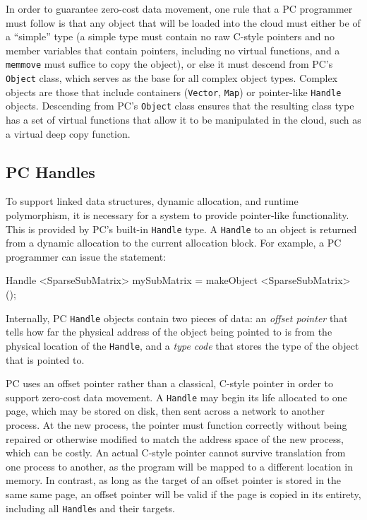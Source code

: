 In order to guarantee zero-cost data movement,
one rule that a PC programmer must follow is that any object that will be loaded into the cloud must either be of a ``simple'' type (a simple type
must contain no raw C-style pointers and no member variables that contain pointers, including no 
virtual functions, and a \texttt{memmove}
must suffice to copy the object), or else it must descend from PC's \texttt{Object} class, which serves as the base for all complex object types.
Complex objects are those that include containers (\texttt{Vector}, \texttt{Map}) or pointer-like \texttt{Handle} objects.  Descending from PC's \texttt{Object} class
ensures that the resulting class type has a set of virtual functions that allow it to be manipulated in the cloud, 
such as a virtual deep copy function.  

\subsection{PC Handles}

To support linked data structures, dynamic allocation, and runtime polymorphism, it is necessary for a 
system to provide pointer-like functionality.  This is provided by PC's built-in \texttt{Handle} type.  
A \texttt{Handle} to an object is returned from a dynamic allocation to the current allocation block.
For example, a PC programmer 
can issue the statement:

\begin{code}
Handle <SparseSubMatrix> mySubMatrix = makeObject <SparseSubMatrix> ();
\end{code}

Internally, PC \texttt{Handle} objects contain two pieces of data: an \emph{offset pointer} that tells how far
the physical address of the object being pointed to is from the physical location of the 
\texttt{Handle}, and a \emph{type code} that stores the type of the
object that is pointed to.  

PC uses an offset pointer rather than a classical, C-style pointer in order to support
zero-cost data movement.  
A \texttt{Handle} may begin its life allocated
to one page, which may be stored on disk, then sent across a network to another process.  At the new process, the pointer
must function correctly without being repaired or otherwise modified to match the address space of the new process, which can be costly.  
An actual C-style pointer
cannot survive translation from one process to another, as the program will be mapped to a different location in memory.
In contrast, as long as the target of an offset pointer is stored in the same same page, an offset pointer will be valid if the
page is copied in its entirety, including all \texttt{Handle}s and their targets.

